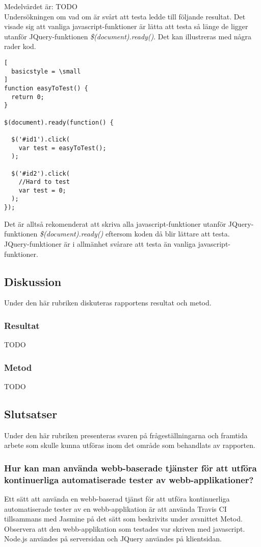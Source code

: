 Medelvärdet är: TODO\\

Undersökningen om vad om är svårt att testa ledde till följande resultat.
Det visade sig att vanliga javascript-funktioner är lätta
att testa så länge de ligger utanför JQuery-funktionen
\emph{\$(document).ready()}. Det kan illustreras med några
rader kod.

\begin{lstlisting}[
  basicstyle = \small
]
function easyToTest() {
  return 0;
}

$(document).ready(function() {

  $('#id1').click(
    var test = easyToTest(); 
  );

  $('#id2').click(
    //Hard to test
    var test = 0; 
  );
});

\end{lstlisting}

Det är alltså rekomenderat att skriva alla javascript-funktioner utanför 
JQuery-funktionen \emph{\$(document).ready()} eftersom koden då blir 
lättare att testa.\\

JQuery-funktioner är i allmänhet svårare att testa än vanliga
javascript-funktioner.

\subsection{Diskussion}
Under den här rubriken diskuteras rapportens resultat
och metod.

\subsubsection{Resultat}
TODO

\subsubsection{Metod}
TODO

\subsection{Slutsatser}
Under den här rubriken presenteras svaren på
frågeställningarna och framtida arbete som skulle
kunna utföras inom det område som behandlats av rapporten.

\subsubsection{Hur kan man använda webb-baserade tjänster för
att utföra kontinuerliga automatiserade tester av webb-applikationer?}
Ett sätt att använda en webb-baserad tjänst för att utföra kontinuerliga 
automatiserade tester av en webb-applikation är att använda  
Travis CI tillsammans med Jasmine på det sätt som beskrivits
under avsnittet Metod. Observera att den webb-applikation som testades
var skriven med javascript. Node.js användes på serversidan och 
JQuery användes på klientsidan.

